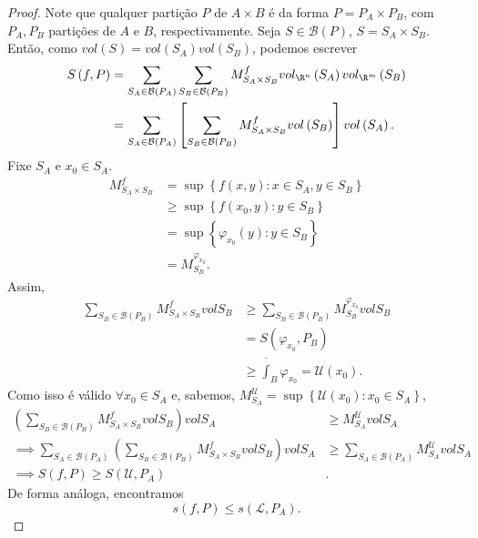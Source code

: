 \begin{proof}
    Note que qualquer partição $P$ de $A\times B$ é da forma $P=P_A \times P_B$, com $P_A, P_B$ partições de $A$ e $B$, respectivamente. Seja $S \in \mathcal{B}\left( P \right) $, $S=S_A \times S_B$. Então, como $vol (S) = vol\left( S_A \right) vol\left( S_B \right) $, podemos escrever
    \begin{align*}
	S\left( f,P \right) &= \sum_{S_A\in \mathcal{B}\left( P_A \right) } \sum_{S_B\in \mathcal{B}\left( P_B \right) } M_{S_A\times S_B}^{f} vol_{\R^{n}}\left( S_A \right) vol_{\R^{m}}\left( S_B \right) \\
	&= \sum_{S_A\in \mathcal{B}\left( P_A \right) } \left[ \sum_{S_B\in \mathcal{B}\left( P_B \right) } M_{S_A\times S_B}^{f}vol\left( S_B \right)  \right] vol\left( S_A \right)
    .\end{align*}
    Fixe $S_A$ e $x_0\in S_A$.
    \begin{align*}
	M_{S_A\times S_B}^{f} &= \sup \left\{ f\left( x,y \right) : x\in S_A, y\in S_B \right\} \\
			  &\ge  \sup\left\{ f\left( x_0,y \right) : y\in S_B \right\} \\
			  &= \sup \left\{ \varphi_{x_0}\left( y \right) : y\in S_B \right\} \\
			  &= M_{S_B}^{\varphi_{x_0}}
    .\end{align*}
    Assim,
    \begin{align*}
	\sum_{S_B\in \mathcal{B}\left( P_B \right) } M_{S_A\times S_B}^{f} vol S_B &\ge \sum_{S_B\in \mathcal{B}\left( P_B \right) } M_{S_B}^{\varphi_{x_0}} vol S_B \\
	&= S\left( \varphi_{x_0}, P_B \right)  \\
										   &\ge \overline{\int}_B \varphi_{x_0} = \mathcal{U}\left( x_0 \right) 
    .\end{align*}
    Como isso é válido $\forall x_0\in S_A$ e, sabemos, $M_{S_A}^{\mathcal{U}} = \sup\left\{ \mathcal{U}\left( x_0 \right) : x_0\in S_A \right\} $,
    \begin{align*}
	\left(  \sum_{S_{B}\in \mathcal{B}\left( P_B \right) } M_{S_A\times S_B}^{f}vol S_B \right) vol S_A &\ge M_{S_A}^\mathcal{U} vol S_A \\
	\implies \sum_{S_A \in \mathcal{B}\left( P_A \right) } \left(  \sum_{S_{B}\in \mathcal{B}\left( P_B \right) } M_{S_A\times S_B}^{f}vol S_B \right) vol S_A &\ge \sum_{S_A \in \mathcal{B}\left( P_A \right)} M_{S_A}^\mathcal{U} vol S_A  \\
	\implies S\left( f, P \right)  \ge S\left( \mathcal{U}, P_A \right) &
    .\end{align*}
    De forma análoga, encontramos \[
    s\left( f,P \right) \le s\left( \mathcal{L}, P_A \right) 
    .\] 


\end{proof}
